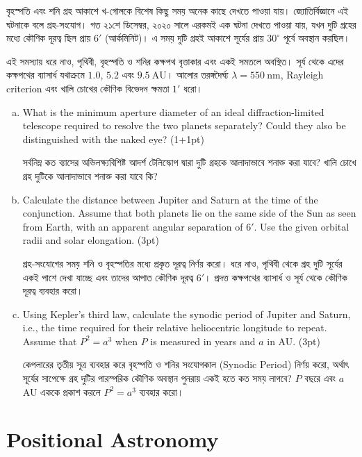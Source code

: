 \documentclass[10pt,a5paper,twoside]{article}
\newcommand{\m}[1]{%
	\unskip\nobreak\hfill
	\mbox{\normalfont(#1pt)}%
}
\begin{document}
বৃহস্পতি এবং শনি গ্রহ আকাশে খ-গোলকে বিশেষ কিছু সময় অনেক কাছে দেখতে পাওয়া যায়। জ্যোতির্বিজ্ঞানে এই ঘটনাকে বলে গ্রহ-সংযোগ। গত ২১শে ডিসেম্বর, ২০২০ সালে এরকমই এক ঘটনা দেখতে পাওয়া যায়, যখন দুটি গ্রহের মধ্যে কৌণিক দূরত্ব ছিল প্রায় $6'$ (আর্কমিনিট)। এ সময় দুটি গ্রহই আকাশে সূর্যের প্রায় $30^\circ$ পূর্বে অবস্থান করছিল।

এই সমস্যায় ধরে নাও, পৃথিবী, বৃহস্পতি ও শনির কক্ষপথ বৃত্তাকার এবং একই সমতলে অবস্থিত। সূর্য থেকে এদের কক্ষপথের ব্যাসার্ধ যথাক্রমে $1.0$, $5.2$ এবং $9.5~\mathrm{AU}$। আলোর তরঙ্গদৈর্ঘ্য $\lambda=550~\mathrm{nm}$, Rayleigh criterion এবং খালি চোখের কৌণিক বিভেদন ক্ষমতা $1'$ ধরো।

\begin{enumerate}[a.]
	
	\item What is the minimum aperture diameter of an ideal diffraction-limited telescope required to resolve the two planets separately? Could they also be distinguished with the naked eye? \m{1+1}
	
	সর্বনিম্ন কত ব্যাসের অভিলক্ষ্যবিশিষ্ট আদর্শ টেলিস্কোপ দ্বারা দুটি গ্রহকে আলাদাভাবে শনাক্ত করা যাবে? খালি চোখে গ্রহ দুটিকে আলাদাভাবে শনাক্ত করা যাবে কি?
	
	\item Calculate the distance between Jupiter and Saturn at the time of the conjunction. Assume that both planets lie on the same side of the Sun as seen from Earth, with an apparent angular separation of $6'$. Use the given orbital radii and solar elongation. \m{3}
	
	গ্রহ-সংযোগের সময় শনি ও বৃহস্পতির মধ্যে প্রকৃত দূরত্ব নির্ণয় করো। ধরে নাও, পৃথিবী থেকে গ্রহ দুটি সূর্যের একই পাশে দেখা যাচ্ছে এবং তাদের আপাত কৌণিক দূরত্ব $6'$। প্রদত্ত কক্ষপথের ব্যাসার্ধ ও সূর্য থেকে কৌণিক দূরত্ব ব্যবহার করো।
	
	\item Using Kepler's third law, calculate the synodic period of Jupiter and Saturn, i.e., the time required for their relative heliocentric longitude to repeat. Assume that $P^2=a^3$ when $P$ is measured in years and $a$ in AU. \m{3}
	
	কেপলারের তৃতীয় সূত্র ব্যবহার করে বৃহস্পতি ও শনির সংযোগকাল (Synodic Period) নির্ণয় করো, অর্থাৎ সূর্যের সাপেক্ষে গ্রহ দুটির পারস্পরিক কৌণিক অবস্থান পুনরায় একই হতে কত সময় লাগবে? $P$ বছরে এবং $a$ AU এককে প্রকাশ করলে $P^2=a^3$ ব্যবহার করো।
	
\end{enumerate}


\clearpage
\section{Positional Astronomy}
\end{document}
